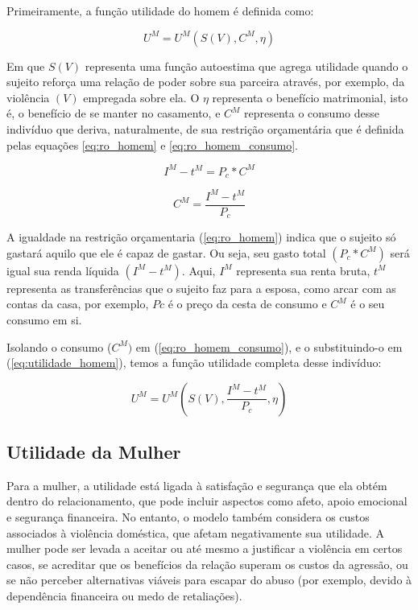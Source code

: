 Primeiramente, a função utilidade do homem é definida como:

\begin{equation}
    U^M = U^M(S(V),C^M,\eta)       
\label{eq:utilidade_homem}
\end{equation}

Em que $S(V)$ representa uma função autoestima que agrega utilidade quando o sujeito reforça uma relação de poder sobre sua parceira através, por exemplo, da violência $(V)$ empregada sobre ela. O $\eta$ representa o benefício matrimonial, isto é, o benefício de se manter no casamento, e $C^M$ representa o consumo desse indivíduo que deriva, naturalmente, de sua restrição orçamentária que é definida pelas equações \ref{eq:ro_homem} e \ref{eq:ro_homem_consumo}.

\begin{equation}
I^M - t^M = P_c * C^M
\label{eq:ro_homem}
\end{equation}

\begin{equation}
C^M = \frac{I^M - t^M}{P_c}
\label{eq:ro_homem_consumo}
\end{equation}

A igualdade na restrição orçamentaria (\ref{eq:ro_homem}) indica que o sujeito só gastará aquilo que ele é capaz de gastar. Ou seja, seu gasto total $(P_c * C^M)$ será igual sua renda líquida $(I^M - t^M)$. Aqui, $I^M$ representa sua renta bruta, $t^M$ representa as transferências que o sujeito faz para a esposa, como arcar com as contas da casa, por exemplo, $Pc$ é o preço da cesta de consumo e $C^M$ é o seu consumo em si.

Isolando o consumo ($C^M)$ em (\ref{eq:ro_homem_consumo}), e o substituindo-o em (\ref{eq:utilidade_homem}), temos a função utilidade completa desse indivíduo:

\begin{equation}
U^M = U^M(S(V),\frac{I^M - t^M}{P_c},\eta)       
\label{eq:utilidade_homem_completa}
\end{equation}

\subsection{Utilidade da Mulher}

Para a mulher, a utilidade está ligada à satisfação e segurança que ela obtém dentro do relacionamento, que pode incluir aspectos como afeto, apoio emocional e segurança financeira. No entanto, o modelo também considera os custos associados à violência doméstica, que afetam negativamente sua utilidade. A mulher pode ser levada a aceitar ou até mesmo a justificar a violência em certos casos, se acreditar que os benefícios da relação superam os custos da agressão, ou se não perceber alternativas viáveis para escapar do abuso (por exemplo, devido à dependência financeira ou medo de retaliações).

